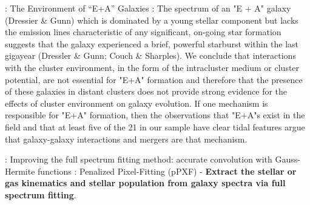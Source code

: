 \documentclass[ceqn,usenatbib,onecolumn]{mnras}
\begin{document}
\par \citet{1996ApJ...466..104Z} : {The Environment of ``E+A'' Galaxies} : The spectrum of an "E + A" galaxy (Dressier \& Gunn) which is dominated by a young stellar component but lacks the emission lines characteristic of any significant, on-going star formation suggests that the galaxy experienced a brief, powerful starburst within the last gigayear (Dressler \& Gunn; Couch \& Sharples). We conclude that interactions with the cluster environment, in the form of the intracluster medium or cluster potential, are not essential for "E+A" formation and therefore that the presence of these galaxies in distant clusters does not provide strong evidence for the effects of cluster environment on galaxy evolution. If one mechanism is responsible for "E+A" formation, then the observations that "E+A"s exist in the field and that at least five of the 21 in our sample have clear tidal features argue that galaxy-galaxy interactions and mergers are that mechanism. 
\par \citet{2017MNRAS.466..798C} : {Improving the full spectrum fitting method: accurate convolution with Gauss-Hermite functions} : Penalized Pixel-Fitting (pPXF) - \textbf{Extract the stellar or gas kinematics and stellar population from galaxy spectra via full spectrum fitting}.
\end{document}
